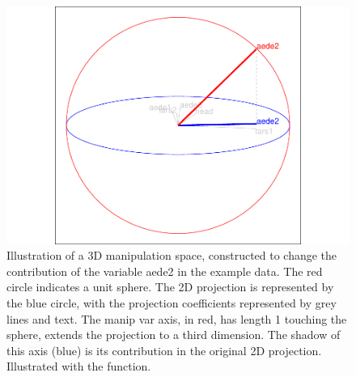\begin{Schunk}
\begin{figure}

{\centering \includegraphics[width=0.7\linewidth]{spinifex_paper_files/figure-latex/step2-1} 

}

\caption[Illustration of a 3D manipulation space, constructed to change the contribution of the variable aede2 in the example data]{Illustration of a 3D manipulation space, constructed to change the contribution of the variable aede2 in the example data. The red circle indicates a unit sphere. The 2D projection is represented by the blue circle, with the projection coefficients represented by grey lines and text. The manip var axis, in red, has length 1 touching the sphere, extends the projection to a third dimension. The shadow of this axis (blue) is its contribution in the original 2D projection. Illustrated with the  function.}\label{fig:step2}
\end{figure}
\end{Schunk}


